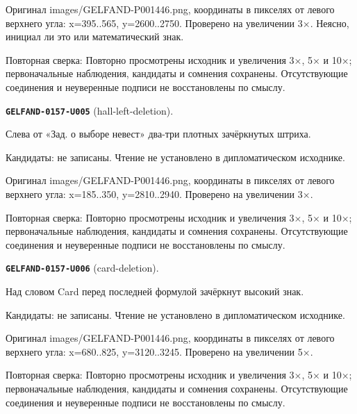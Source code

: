 Оригинал images/GELFAND-P001446.png, координаты в пикселях от левого верхнего угла: x=395..565, y=2600..2750. Проверено на увеличении 3×. Неясно, инициал ли это или математический знак.\par
Повторная сверка: Повторно просмотрены исходник и увеличения 3×, 5× и 10×; первоначальные наблюдения, кандидаты и сомнения сохранены. Отсутствующие соединения и неуверенные подписи не восстановлены по смыслу.\par\medskip
\par\noindent\leavevmode{}\label{GELFAND-0157-U005}\label{GELFAND-P001446:hall-left-deletion}\textbf{\texttt{GELFAND-0157-U005}} (hall-left-deletion).\nopagebreak[4]\par
Слева от «Зад. о выборе невест» два-три плотных зачёркнутых штриха.\par
Кандидаты: не записаны. Чтение не установлено в дипломатическом исходнике.\par
Оригинал images/GELFAND-P001446.png, координаты в пикселях от левого верхнего угла: x=185..350, y=2810..2940. Проверено на увеличении 3×.\par
Повторная сверка: Повторно просмотрены исходник и увеличения 3×, 5× и 10×; первоначальные наблюдения, кандидаты и сомнения сохранены. Отсутствующие соединения и неуверенные подписи не восстановлены по смыслу.\par\medskip
\par\noindent\leavevmode{}\label{GELFAND-0157-U006}\label{GELFAND-P001446:card-deletion}\textbf{\texttt{GELFAND-0157-U006}} (card-deletion).\nopagebreak[4]\par
Над словом Card перед последней формулой зачёркнут высокий знак.\par
Кандидаты: не записаны. Чтение не установлено в дипломатическом исходнике.\par
Оригинал images/GELFAND-P001446.png, координаты в пикселях от левого верхнего угла: x=680..825, y=3120..3245. Проверено на увеличении 5×.\par
Повторная сверка: Повторно просмотрены исходник и увеличения 3×, 5× и 10×; первоначальные наблюдения, кандидаты и сомнения сохранены. Отсутствующие соединения и неуверенные подписи не восстановлены по смыслу.\par\medskip
